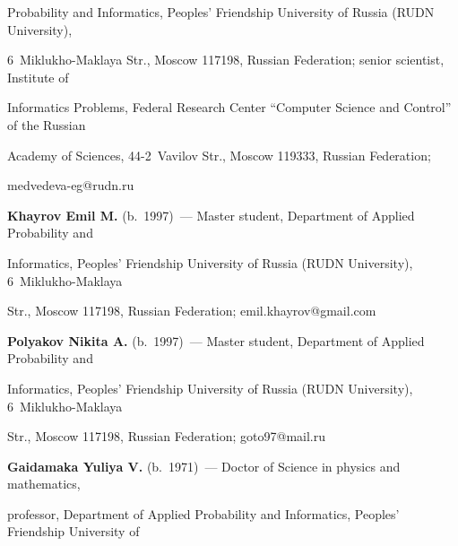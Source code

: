 Probability and Informatics, Peoples' Friendship University of Russia (RUDN University), 


6~Miklukho-Maklaya Str., Moscow 117198, Russian Federation; senior scientist, Institute of 


Informatics Problems, Federal Research Center ``Computer Science and Control'' of the Russian 


Academy of Sciences, 44-2~Vavilov Str., Moscow 119333, Russian Federation; 


\mbox{medvedeva-eg@rudn.ru}





\vspace*{3pt}





\noindent


\textbf{Khayrov Emil M.} (b.\ 1997)~--- Master student, Department of Applied Probability and 


Informatics, Peoples' Friendship University of Russia (RUDN University), 6~Miklukho-Maklaya 


Str., Moscow 117198, Russian Federation; \mbox{emil.khayrov@gmail.com}








\vspace*{3pt}





\noindent


\textbf{Polyakov Nikita A.} (b.\ 1997)~--- Master student, Department of Applied Probability and 


Informatics, Peoples' Friendship University of Russia (RUDN University), 6~Miklukho-Maklaya 


Str., Moscow 117198, Russian Federation; \mbox{goto97@mail.ru}








\vspace*{3pt}





\noindent


\textbf{Gaidamaka Yuliya V.} (b.\ 1971)~--- Doctor of Science in physics and mathematics, 


professor, Department of Applied Probability and Informatics, Peoples' Friendship University of 


